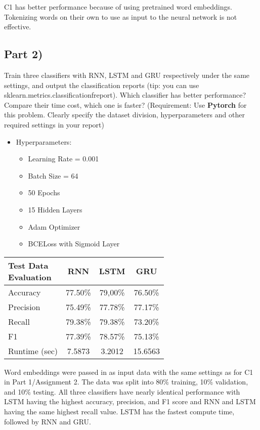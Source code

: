 \documentclass[conference]{IEEEtran}
\begin{document}
C1 has better performance because of using pretrained word embeddings. Tokenizing words on their own to use as input to the neural network is not effective.

\subsection{Part 2)}
\par \noindent Train three classifiers with RNN, LSTM and GRU respectively under the same settings, and output the classification reports (tip: you can use sklearn.metrics.classification\textunderscore freport). Which classifier has better performance? Compare their time cost, which one is faster? (Requirement: Use \textbf{Pytorch} for this problem. Clearly specify the dataset division, hyperparameters and other required settings in your report)

\begin{multicols}{2}
\begin{itemize}
\item Hyperparameters:
\begin{itemize}
\item Learning Rate = 0.001
\item Batch Size = 64
\item 50 Epochs
\item 15 Hidden Layers
\item Adam Optimizer
\item BCELoss with Sigmoid Layer
\end{itemize}
\end{itemize}
\columnbreak
\begin{table}[H]
    \centering
    \begin{tabular}{|l|c|c|c|}
        \hline
        \makecell{Test Data\\ Evaluation} & RNN & LSTM & GRU \\
        \hline
        Accuracy  	  & 77.50\% & 79,00\% & 76.50\% \\
        Precision 	  & 75.49\% & 77.78\% & 77.17\% \\
        Recall        & 79.38\% & 79.38\% & 73.20\% \\
        F1       	  & 77.39\% & 78.57\% & 75.13\% \\
        Runtime (sec) & 7.5873 & 3.2012 & 15.6563 \\
        \hline
    \end{tabular}
\end{table}
\end{multicols}
Word embeddings were passed in as input data with the same settings as for C1 in Part 1/Assignment 2. The data was split into 80\% training, 10\% validation, and 10\% testing. All three classifiers have nearly identical performance with LSTM having the highest accuracy, precision, and F1 score and RNN and LSTM having the same highest recall value. LSTM has the fastest compute time, followed by RNN and GRU.
\end{document}
